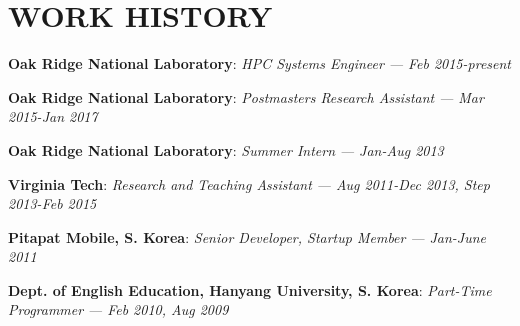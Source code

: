 \section{WORK HISTORY} 
\vspace{0.03in} 

{\bf Oak Ridge National Laboratory}: \emph{HPC Systems Engineer}
{\it \footnotesize --- Feb 2015-present}
\vspace{-0.15in}

{\bf Oak Ridge National Laboratory}: \emph{Postmasters Research Assistant}
{\it \footnotesize --- Mar 2015-Jan 2017}
\vspace{-0.15in}

{\bf Oak Ridge National Laboratory}: \emph{Summer Intern}
{\it \footnotesize --- Jan-Aug 2013}
\vspace{-0.15in}

{\bf Virginia Tech}: \emph{Research and Teaching Assistant}
{\it \footnotesize --- Aug 2011-Dec 2013, Step 2013-Feb 2015}
\vspace{-0.15in}

{\bf Pitapat Mobile, S. Korea}: \emph{Senior Developer, Startup Member}
{\it \footnotesize --- Jan-June 2011}
\vspace{-0.15in}

{\bf Dept. of English Education, Hanyang University, S. Korea}: \emph{Part-Time Programmer}
{\it \footnotesize --- Feb 2010, Aug 2009}
\vspace{-0.15in}


